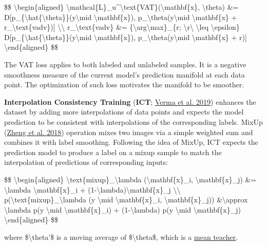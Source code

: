 \$\$ \textbackslash begin\{aligned\} \textbackslash mathcal\{L\}\_u\^{}\textbackslash text\{VAT\}(\textbackslash mathbf\{x\}, \textbackslash theta) \&= D{[}p\_\{\textbackslash hat\{\textbackslash theta\}\}(y\textbackslash mid \textbackslash mathbf\{x\}), p\_\textbackslash theta(y\textbackslash mid \textbackslash mathbf\{x\} + r\_\textbackslash text\{vadv\}){]} \textbackslash\textbackslash{} r\_\textbackslash text\{vadv\} \&= \{\textbackslash arg\textbackslash max\}\_\{r; \textbackslash\textbar r\textbackslash\textbar{} \textbackslash leq \textbackslash epsilon\} D{[}p\_\{\textbackslash hat\{\textbackslash theta\}\}(y\textbackslash mid \textbackslash mathbf\{x\}), p\_\textbackslash theta(y\textbackslash mid \textbackslash mathbf\{x\} + r){]} \textbackslash end\{aligned\} \$\$

The VAT loss applies to both labeled and unlabeled samples. It is a negative smoothness measure of the current model's prediction manifold at each data point. The optimization of such loss motivates the manifold to be smoother.

\textbf{Interpolation Consistency Training} (\textbf{ICT}; \href{https://arxiv.org/abs/1903.03825}{Verma et al. 2019}) enhances the dataset by adding more interpolations of data points and expects the model prediction to be consistent with interpolations of the corresponding labels. MixUp (\href{https://arxiv.org/abs/1710.09412}{Zheng et al. 2018}) operation mixes two images via a simple weighted sum and combines it with label smoothing. Following the idea of MixUp, ICT expects the prediction model to produce a label on a mixup sample to match the interpolation of predictions of corresponding inputs:

\$\$ \textbackslash begin\{aligned\} \textbackslash text\{mixup\}\_\textbackslash lambda (\textbackslash mathbf\{x\}\_i, \textbackslash mathbf\{x\}\_j) \&= \textbackslash lambda \textbackslash mathbf\{x\}\_i + (1-\textbackslash lambda)\textbackslash mathbf\{x\}\_j \textbackslash\textbackslash{} p(\textbackslash text\{mixup\}\_\textbackslash lambda (y \textbackslash mid \textbackslash mathbf\{x\}\_i, \textbackslash mathbf\{x\}\_j)) \&\textbackslash approx \textbackslash lambda p(y \textbackslash mid \textbackslash mathbf\{x\}\_i) + (1-\textbackslash lambda) p(y \textbackslash mid \textbackslash mathbf\{x\}\_j) \textbackslash end\{aligned\} \$\$

where \$\textbackslash theta'\$ is a moving average of \$\textbackslash theta\$, which is a \hyperref[mean-teachers]{mean teacher}.

